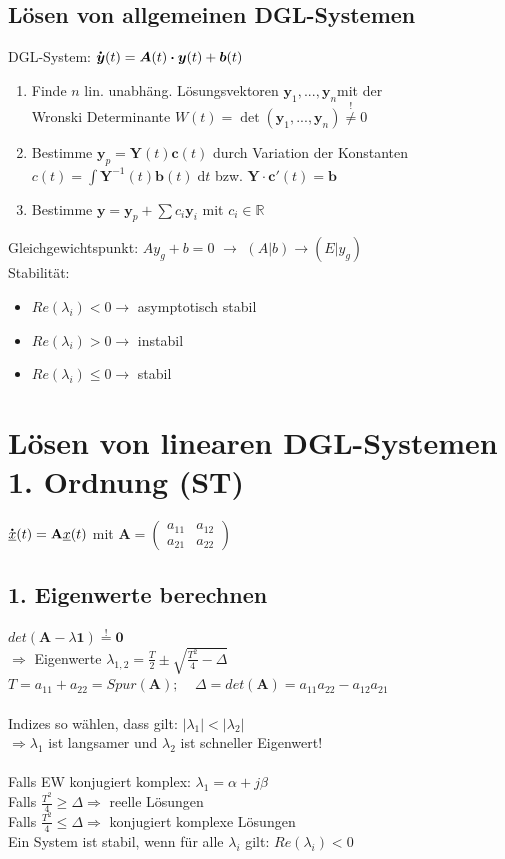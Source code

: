 \documentclass[6pt,a4paper]{scrartcl}
\newcommand{\ma}[1]{\ensuremath{\boldsymbol {#1}}}												%
\newcommand{\bdot}{\ensuremath{\boldsymbol \cdot}} 												%
\newcommand{\mustbe}{\stackrel{!}{=}}
\renewcommand{\vec}[1]{\ensuremath{\boldsymbol {#1}}}											%
\renewcommand*{\dot}[1]{\accentset{\mbox{\textrm{\large\bfseries .}} }{#1}}						%
\newcommand{\ra}[0]{\ensuremath{\rightarrow}} 									%
\newcommand{\diff}{\ensuremath{\;\mathrm d}}									%
\newcommand{\R}{\ensuremath{\mathbb R}}
\begin{document}
\begin{multicols*}{4}
\subsection{Lösen von allgemeinen DGL-Systemen}
DGL-System: $\dot {\vec y}(t) = \ma A(t) \bdot \vec y(t) + \vec b(t)$
\begin{enumerate}
	\item Finde $n$ lin. unabhäng. Lösungsvektoren $\vec y_1,...,\vec y_n$mit der\\
	Wronski Determinante $W(t) = \det(\vec y_1,...,\vec y_n) \stackrel{!}{\ne} 0$
	\item Bestimme $\vec y_p = \ma Y(t) \vec c(t)$ durch Variation der Konstanten\\
	$c(t) = \int \ma Y^{-1}(t) \vec b(t) \diff t$ bzw. $\ma Y \cdot \vec c'(t) = \vec b$
	\item Bestimme $\vec y = \vec y_p + \sum c_i \vec y_i$ mit $c_i \in \R$
\end{enumerate}
Gleichgewichtspunkt: $A y_g + b = 0$ $\ra$ $(A | b) \ra (E | y_g)$ \\
Stabilität:
\begin{itemize}\itemsep-1pt
	\item $Re(\lambda_i) < 0 \ra$ asymptotisch stabil 
	\item $Re(\lambda_i) > 0 \ra$ instabil
	\item $Re(\lambda_i) \le 0 \ra$ stabil
\end{itemize}

\section{Lösen von linearen DGL-Systemen 1. Ordnung (ST)}
$\dot {\underline{x}}(t)=\textbf{A}\underline{x}(t)$ \quad mit \quad
$\textbf{A} = \begin{pmatrix}
a_{11} & a_{12} \\
a_{21} & a_{22} 
\end{pmatrix}$
\subsection*{1. Eigenwerte berechnen}
$det(\textbf{A}-\lambda \textbf{1})\mustbe \textbf{0}$\\
$\Rightarrow$ Eigenwerte $\lambda_{1,2}=\frac{T}{2}\pm \sqrt{\frac{T^2}{4}-\Delta}$\\
$T=a_{11}+a_{22}=Spur(\textbf{A});\;\;\;\;\Delta =det(\textbf{A})=a_{11}a_{22}-a_{12}a_{21}$\\\\
Indizes so wählen, dass gilt: $|\lambda_1|<|\lambda_2|$\\
$\Rightarrow \lambda_1$ ist langsamer und $\lambda_2$ ist schneller Eigenwert!\\\\
Falls EW konjugiert komplex: $\lambda_1=\alpha +j\beta$\\
Falls $\frac{T^2}{4}\ge \Delta \Rightarrow$ reelle Lösungen\\
Falls $\frac{T^2}{4}\le \Delta \Rightarrow$ konjugiert komplexe Lösungen\\
Ein System ist stabil, wenn für alle $\lambda_i$ gilt: $Re(\lambda_i)<0$

\end{multicols*}
\end{document}
